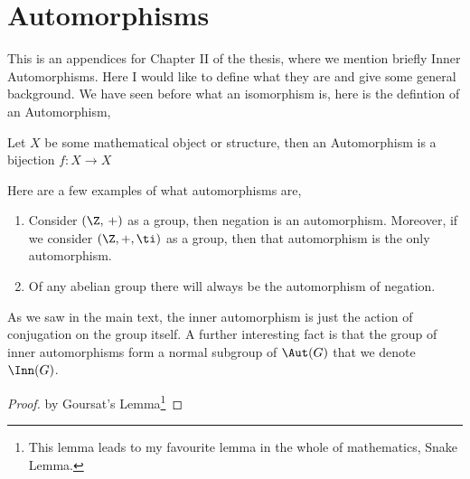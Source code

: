 
\section{Automorphisms}

This is an appendices for Chapter II of the thesis, where we mention briefly Inner Automorphisms. Here I would like to define what they are and give some general background. We have seen before what an isomorphism is, here is the defintion of an Automorphism,
\begin{ndefi}[Automorphism]
  Let $X$ be some mathematical object or structure, then an Automorphism is a bijection $f : X \to X$
\end{ndefi}
Here are a few examples of what automorphisms are,
\begin{enumerate}
  \item Consider $(\Z,\,+)$ as a group, then negation is an automorphism. Moreover, if we consider $(\Z, +, \ti)$ as a group, then that automorphism is the only automorphism.
  \item Of any abelian group there will always be the automorphism of negation.
\end{enumerate}

As we saw in the main text, the inner automorphism is just the action of conjugation on the group itself. A further interesting fact is that the group of inner automorphisms form a normal subgroup of $\Aut(G)$ that we denote $\Inn(G)$.
\begin{proof}
  by Goursat's Lemma\footnote{This lemma leads to my favourite lemma in the whole of mathematics, Snake Lemma.}
\end{proof}

